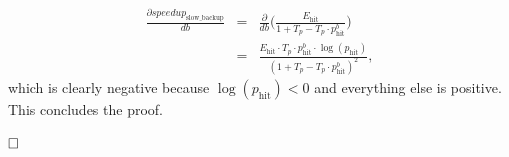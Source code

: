 \begin{eqnarray*}
    \frac{\partial speedup_{\mathrm{slow\_backup}} }{db} &=& \frac{\partial}{db} \bigg(\frac{E_{\mathrm{hit}}}{1 + T_p - T_p \cdot p_{\mathrm{hit}}^b}\bigg)\\    
    &=& \frac{
        E_{\mathrm{hit}} \cdot T_p \cdot p_{\text{hit}}^b \cdot \log(p_{\mathrm{hit}})
    }{
       (1+T_p - T_p \cdot p_{\text{hit}}^b)^2
    },
\end{eqnarray*}
which is clearly negative because $\log(p_{\mathrm{hit}}) < 0$ and everything else is positive.
This concludes the proof.

$\hfill\square$

